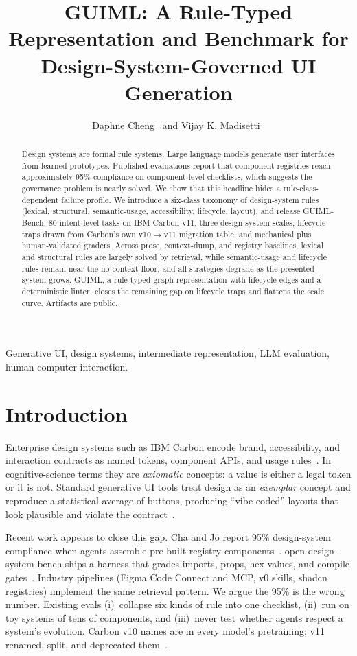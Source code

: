 \documentclass[journal]{IEEEtran}
\title{GUIML: A Rule-Typed Representation and Benchmark for Design-System-Governed UI Generation}
\author{Daphne Cheng~\IEEEmembership{Student Member,~IEEE,} and Vijay K. Madisetti~\IEEEmembership{Fellow,~IEEE}}
\begin{document}
\maketitle

\begin{abstract}
Design systems are formal rule systems. Large language models generate user interfaces from learned prototypes. Published evaluations report that component registries reach approximately 95\% compliance on component-level checklists, which suggests the governance problem is nearly solved. We show that this headline hides a rule-class-dependent failure profile. We introduce a six-class taxonomy of design-system rules (lexical, structural, semantic-usage, accessibility, lifecycle, layout), and release GUIML-Bench: 80 intent-level tasks on IBM Carbon v11, three design-system scales, lifecycle traps drawn from Carbon's own v10$\to$v11 migration table, and mechanical plus human-validated graders. Across prose, context-dump, and registry baselines, lexical and structural rules are largely solved by retrieval, while semantic-usage and lifecycle rules remain near the no-context floor, and all strategies degrade as the presented system grows. GUIML, a rule-typed graph representation with lifecycle edges and a deterministic linter, closes the remaining gap on lifecycle traps and flattens the scale curve. Artifacts are public.
\end{abstract}

\begin{IEEEkeywords}
Generative UI, design systems, intermediate representation, LLM evaluation, human-computer interaction.
\end{IEEEkeywords}

\section{Introduction}
Enterprise design systems such as IBM Carbon encode brand, accessibility, and interaction contracts as named tokens, component APIs, and usage rules~\cite{carbon}. In cognitive-science terms they are \emph{axiomatic} concepts: a value is either a legal token or it is not. Standard generative UI tools treat design as an \emph{exemplar} concept and reproduce a statistical average of buttons, producing ``vibe-coded'' layouts that look plausible and violate the contract~\cite{lindley2026,cha2026}.

Recent work appears to close this gap. Cha and Jo report 95\% design-system compliance when agents assemble pre-built registry components~\cite{cha2026}. open-design-system-bench ships a harness that grades imports, props, hex values, and compile gates~\cite{odsb}. Industry pipelines (Figma Code Connect and MCP, v0 skills, shadcn registries) implement the same retrieval pattern. We argue the 95\% is the wrong number. Existing evals (i)~collapse six kinds of rule into one checklist, (ii)~run on toy systems of tens of components, and (iii)~never test whether agents respect a system's evolution. Carbon v10 names are in every model's pretraining; v11 renamed, split, and deprecated them~\cite{carbonv11}.
\end{document}
